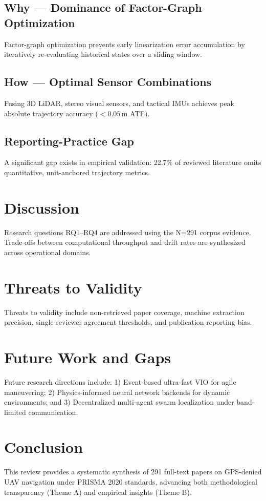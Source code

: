 \documentclass[journal,10pt,twocolumn]{IEEEtran}
\begin{document}
\subsection{Why --- Dominance of Factor-Graph Optimization}
Factor-graph optimization prevents early linearization error accumulation by iteratively re-evaluating historical states over a sliding window.

\subsection{How --- Optimal Sensor Combinations}
Fusing 3D LiDAR, stereo visual sensors, and tactical IMUs achieves peak absolute trajectory accuracy ($<0.05$\,m ATE).

\subsection{Reporting-Practice Gap}
A significant gap exists in empirical validation: 22.7\% of reviewed literature omits quantitative, unit-anchored trajectory metrics.

\section{Discussion}
Research questions RQ1--RQ4 are addressed using the N=291 corpus evidence. Trade-offs between computational throughput and drift rates are synthesized across operational domains.

\section{Threats to Validity}
Threats to validity include non-retrieved paper coverage, machine extraction precision, single-reviewer agreement thresholds, and publication reporting bias.

\section{Future Work and Gaps}
Future research directions include: 1) Event-based ultra-fast VIO for agile maneuvering; 2) Physics-informed neural network backends for dynamic environments; and 3) Decentralized multi-agent swarm localization under band-limited communication.

\section{Conclusion}
This review provides a systematic synthesis of 291 full-text papers on GPS-denied UAV navigation under PRISMA 2020 standards, advancing both methodological transparency (Theme A) and empirical insights (Theme B).
\end{document}

